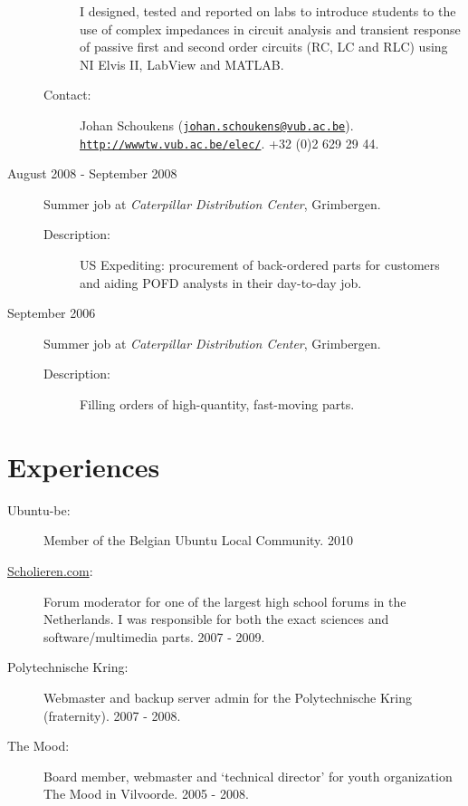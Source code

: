 \documentclass[a4paper]{article}
\begin{document}
\begin{description}
\begin{description}
           I designed, tested and reported on labs to introduce students to the use of complex impedances in circuit analysis and transient response of passive first and second order circuits (RC, LC and RLC)
           using NI Elvis II, LabView and MATLAB.
     \item [Contact:]
           Johan Schoukens (\href{mailto:johan.schoukens@vub.ac.be}{\tt johan.schoukens@vub.ac.be}).\\
           \href{http://wwwtw.vub.ac.be/elec/}{\tt http://wwwtw.vub.ac.be/elec/}.
           +32 (0)2 629 29 44.
    \end{description}
  \item[August 2008 - September 2008] Summer job at \textit{Caterpillar Distribution Center}, Grimbergen.
    \begin{description}
     \item [Description:] US Expediting: procurement of back-ordered parts for customers and aiding POFD analysts in their day-to-day job.
    \end{description}
  \item[September 2006] Summer job at \textit{Caterpillar Distribution Center}, Grimbergen.
    \begin{description}
     \item [Description:] Filling orders of high-quantity, fast-moving parts.
    \end{description}
\end{description}


\section*{Experiences}
\begin{description}
 \item[Ubuntu-be:] Member of the Belgian Ubuntu Local Community. 2010
 \item[\href{http://forum.scholieren.com}{Scholieren.com}:] Forum moderator for one of the largest high school forums in the Netherlands. I was responsible for both the exact sciences and software/multimedia parts. 2007 - 2009.
 \item[Polytechnische Kring:] Webmaster and backup server admin for the Polytechnische Kring (fraternity). 2007 - 2008.
 \item[The Mood:] Board member, webmaster and `technical director' for youth organization The Mood in Vilvoorde. 2005 - 2008.
\end{description}
\end{document}
